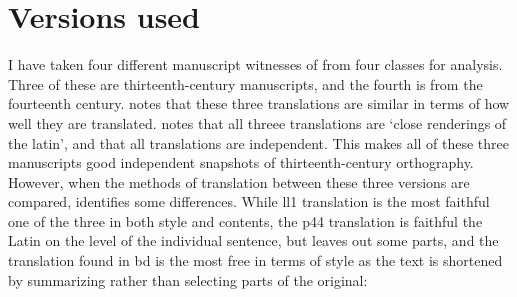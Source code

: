 \section{Versions used}
I have taken four different manuscript witnesses of  from four classes for analysis.
Three of these are thirteenth-century manuscripts, and the fourth is from the fourteenth century.
\Textcite{bowen_testunau_1974}  notes that these three translations  are similar in terms of how well they are translated.  
\Textcite[xxix]{roberts_brut_1971} notes that all threee translations are `close renderings of the latin', and that all translations are independent.
This makes all of these three  manuscripts good independent snapshots of thirteenth-century orthography.
However, when the methods of translation between these three versions are compared, \textcite{bowen_testunau_1974} identifies some differences.
While \gls{ll1} translation is the most faithful one of the three in both style and contents, the \gls{p44} translation is faithful the Latin on the level of the individual sentence, but leaves out some parts, and the translation found in \gls{bd} is the most free in terms of style as the text is shortened by summarizing rather than selecting parts of the original:
